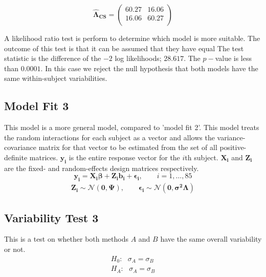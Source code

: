 \documentclass[12pt, a4paper]{report}
\theoremstyle{plain}
\theoremstyle{definition}
\theoremstyle{remark}
\begin{document}
	\begin{equation}
	\boldsymbol{\hat{\Lambda}_{CS}} = \left( \begin{array}{cc}
	60.27  & 16.06  \\
	16.06  & 60.27  \\
	\end{array}\right)
	\end{equation}
	
	A likelihood ratio test is perform to determine which model is more suitable.
	The outcome of this test is that it can be assumed that they have equal
	The test statistic is the difference of the $-2$ log likelihoods; $28.617$. The $p-$value is less than $0.0001$. In this case we reject the null hypothesis that both models have the same within-subject variabilities.
	
	\subsection{Model Fit 3}
	
	This model is a more general model, compared to 'model fit 2'. This model treats the random interactions for each subject as a vector and
	allows the variance-covariance matrix for that vector to be estimated from the set of all positive-definite matrices.
	$\boldsymbol{y_{i}}$ is the entire response vector for the $i$th subject.
	$\boldsymbol{X_{i}}$ and $\boldsymbol{Z_{i}}$  are the fixed- and random-effects design matrices respectively.
	\begin{equation*}
	\boldsymbol{y_{i}} = \boldsymbol{X_{i}\beta}  + \boldsymbol{Z_{i}b_{i}} + \boldsymbol{\epsilon_{i}}, \qquad i=1,\dots,85
	\end{equation*}
	\begin{eqnarray*}
		\boldsymbol{Z_{i}} \sim \mathcal{N}(\boldsymbol{0,\Psi}),\qquad
		\boldsymbol{\epsilon_{i}} \sim \mathcal{N}(\boldsymbol{0,\sigma^2\Lambda})
	\end{eqnarray*}
	

	\subsection{Variability Test 3}
	This is a test on whether both methods $A$ and $B$ have the same overall variability or not.
	\begin{eqnarray}
	H_{0}: \mbox{ }\sigma_{A}  = \sigma_{B} \\
	H_{A}: \mbox{ }\sigma_{A}  = \sigma_{B}
	\end{eqnarray}
	
\end{document}
